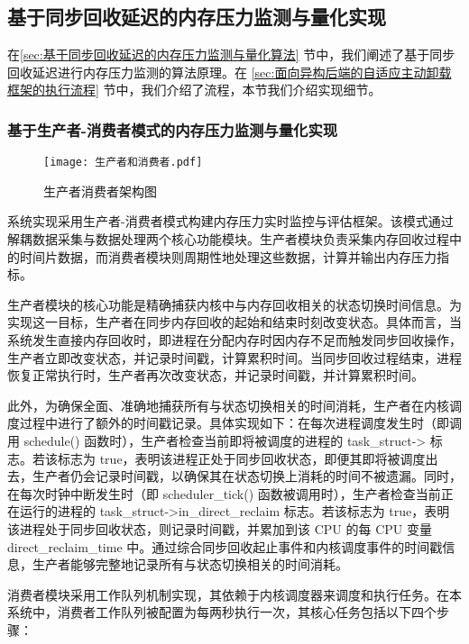 \subsection{基于同步回收延迟的内存压力监测与量化实现}

在\ref{sec:基于同步回收延迟的内存压力监测与量化算法} 节中，我们阐述了基于同步回收延迟进行内存压力监测的算法原理。在 \ref{sec:面向异构后端的自适应主动卸载框架的执行流程} 节中，我们介绍了流程，本节我们介绍实现细节。

\subsubsection{基于生产者-消费者模式的内存压力监测与量化实现}

\begin{figure}[H]
    \centering
    \texttt{[image: 生产者和消费者.pdf]}
    \caption{生产者消费者架构图}
    \label{fig:producer-consumer}
\end{figure}



系统实现采用生产者-消费者模式构建内存压力实时监控与评估框架。该模式通过解耦数据采集与数据处理两个核心功能模块。生产者模块负责采集内存回收过程中的时间片数据，而消费者模块则周期性地处理这些数据，计算并输出内存压力指标。

生产者模块的核心功能是精确捕获内核中与内存回收相关的状态切换时间信息。为实现这一目标，生产者在同步内存回收的起始和结束时刻改变状态。具体而言，当系统发生直接内存回收时，即进程在分配内存时因内存不足而触发同步回收操作，生产者立即改变状态，并记录时间戳，计算累积时间。当同步回收过程结束，进程恢复正常执行时，生产者再次改变状态，并记录时间戳，并计算累积时间。

此外，为确保全面、准确地捕获所有与状态切换相关的时间消耗，生产者在内核调度过程中进行了额外的时间戳记录。具体实现如下：在每次进程调度发生时（即调用 schedule() 函数时），生产者检查当前即将被调度的进程的 task\_struct->  标志。若该标志为 true，表明该进程正处于同步回收状态，即便其即将被调度出去，生产者仍会记录时间戳，以确保其在状态切换上消耗的时间不被遗漏。同时，在每次时钟中断发生时（即 scheduler\_tick() 函数被调用时），生产者检查当前正在运行的进程的 task\_struct->in\_direct\_reclaim 标志。若该标志为 true，表明该进程处于同步回收状态，则记录时间戳，并累加到该 CPU 的每 CPU 变量 direct\_reclaim\_time 中。通过综合同步回收起止事件和内核调度事件的时间戳信息，生产者能够完整地记录所有与状态切换相关的时间消耗。

消费者模块采用工作队列机制实现，其依赖于内核调度器来调度和执行任务。在本系统中，消费者工作队列被配置为每两秒执行一次，其核心任务包括以下四个步骤：

